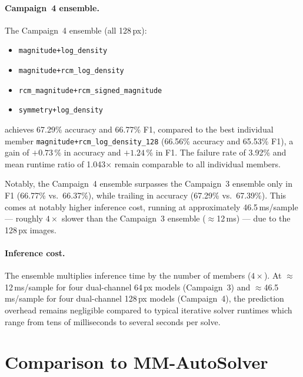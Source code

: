 \paragraph[Campaign 4 ensemble.]{Campaign~4 ensemble.}
The Campaign~4 ensemble (all 128\,px):
\begin{itemize}
  \item \texttt{magnitude+log\_density}
  \item \texttt{magnitude+rcm\_log\_density}
  \item \texttt{rcm\_magnitude+rcm\_signed\_magnitude}
  \item \texttt{symmetry+log\_density}
\end{itemize}
achieves 67.29\% accuracy and 66.77\% F1, compared to the best individual member
\texttt{magnitude+rcm\_log\_density\_128} (66.56\% accuracy and 65.53\% F1),
a gain of $+0.73$\,\% in accuracy and $+1.24$\,\% in F1.
The failure rate of 3.92\% and mean runtime ratio of 1.043$\times$ remain comparable to all individual members.

Notably, the Campaign~4 ensemble surpasses the Campaign~3 ensemble only in F1 (66.77\% vs.\ 66.37\%),
while trailing in accuracy (67.29\% vs.\ 67.39\%).
This comes at notably higher inference cost, running at approximately 46.5\,ms/sample —
roughly $4\times$ slower than the Campaign~3 ensemble ($\approx$12\,ms) — due to the 128\,px images.

\paragraph{Inference cost.}
The ensemble multiplies inference time by the number of members ($4\times$).
At $\approx$12\,ms/sample for four dual-channel 64\,px models (Campaign~3) and
$\approx$46.5\,ms/sample for four dual-channel 128\,px models (Campaign~4), the
prediction overhead remains negligible compared to typical iterative solver runtimes
which range from tens of milliseconds to several seconds per solve.

\section{Comparison to MM-AutoSolver}\label{sec:comparison-mm}

